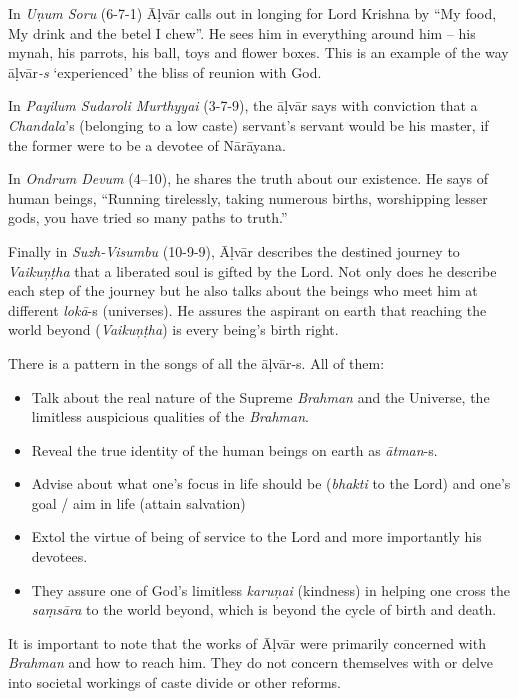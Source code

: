 In \textit{Uṇum Soru} (6-7-1) Āḷvār calls out in longing for Lord Krishna by “My food, My drink and the betel I chew”. He sees him in everything around him – his mynah, his parrots, his ball, toys and flower boxes. This is an example of the way āḷvār\textit{-s} ‘experienced’ the bliss of reunion with God.

In \textit{Payilum Sudaroli Murthyyai} (3-7-9), the āḷvār says with conviction that a \textit{Chandala}’s (belonging to a low caste) servant’s servant would be his master, if the former were to be a devotee of Nārāyana.

In \textit{Ondrum Devum} (4–10), he shares the truth about our existence. He says of human beings, “Running tirelessly, taking numerous births, worshipping lesser gods, you have tried so many paths to truth.”

Finally in \textit{Suzh-Visumbu} (10-9-9), Āḷvār describes the destined journey to \textit{Vaikuņṭha} that a liberated soul is gifted by the Lord. Not only does he describe each step of the journey but he also talks about the beings who meet him at different \textit{lokā}-s (universes). He assures the aspirant on earth that reaching the world beyond (\textit{Vaikuņṭha}) is every being’s birth right.

There is a pattern in the songs of all the āḷvār-s. All of them:

\begin{itemize}
\item Talk about the real nature of the Supreme \textit{Brahman }and the Universe, the limitless auspicious qualities of the \textit{Brahman}.

 \item Reveal the true identity of the human beings on earth as \textit{ātman}-s.

 \item Advise about what one’s focus in life should be (\textit{bhakti} to the Lord) and one’s goal / aim in life (attain salvation)

 \item Extol the virtue of being of service to the Lord and more importantly his devotees.

 \item They assure one of God’s limitless \textit{karuņai }(kindness) in helping one cross the \textit{saṃsāra} to the world beyond, which is beyond the cycle of birth and death.

\end{itemize}

It is important to note that the works of Āḷvār were primarily concerned with \textit{Brahman} and how to reach him. They do not concern themselves with or delve into societal workings of caste divide or other reforms.

